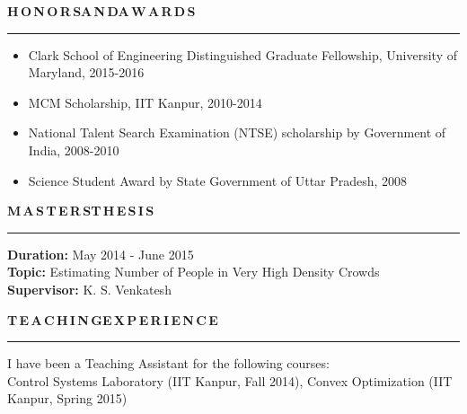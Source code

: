 \documentclass[11pt, a4paper]{article}
\begin{document}
%

%
	
\vspace{8pt}

\textbf{H\,O\,N\,O\,R\,S{\hspace{0.6em}}A\,N\,D{\hspace{0.6em}}A\,W\,A\,R\,D\,S}
\vspace{5pt}
\hrule
\vspace{-3pt}
\begin{itemize}[leftmargin=*] \itemsep1pt \parskip0pt 
\item Clark School of Engineering Distinguished Graduate Fellowship, University of Maryland, 2015-2016
\item MCM Scholarship, IIT Kanpur, 2010-2014
\item National Talent Search Examination (NTSE) scholarship by Government of India, 2008-2010
\item Science Student Award by State Government of Uttar Pradesh, 2008
\end{itemize}

\vspace{-2pt}

\textbf{M\,A\,S\,T\,E\,R\,S{\hspace{0.6em}}T\,H\,E\,S\,I\,S}
\vspace{5pt}
\hrule
\vspace{7pt}
\textbf{Duration: }May 2014 - June 2015 \\
\textbf{Topic: }Estimating Number of People in Very High Density Crowds \\
\textbf{Supervisor: }K. S. Venkatesh 

\vspace{8pt}

\textbf{T\,E\,A\,C\,H\,I\,N\,G{\hspace{0.6em}}E\,X\,P\,E\,R\,I\,E\,N\,C\,E}
\vspace{5pt}
\hrule
\vspace{7pt}
I have been a Teaching Assistant for the following courses:\\
Control Systems Laboratory (IIT Kanpur, Fall 2014), Convex Optimization (IIT Kanpur, Spring 2015)
\end{document}
